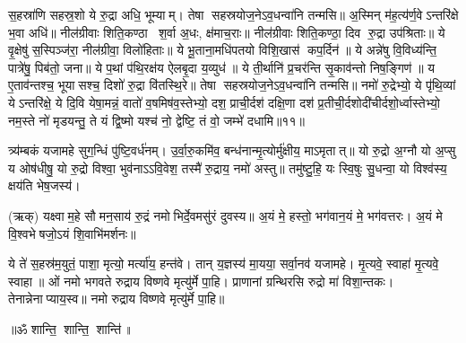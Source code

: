 स॒हस्रा॑णि सहस्र॒शो ये रु॒द्रा अधि॒ भूम्याम्। तेषा सहस्रयोज॒ने\-ऽव॒धन्वा॑नि तन्मसि॥ अ॒स्मिन् म॑ह॒त्य॑र्ण॒वेऽन्तरि॑क्षे भ॒वा अधि॑॥ नील॑ग्रीवाः शिति॒कण्ठा श॒र्वा अ॒धः, क्ष॑माच॒राः॥ नील॑ग्रीवाः शिति॒कण्ठा॒ दिव रु॒द्रा उप॑श्रिताः॥ ये वृ॒क्षेषु॑ स॒स्पिञ्ज॑रा॒ नील॑ग्रीवा॒ विलो॑हिताः॥ ये भू॒ताना॒मधि॑पतयो विशि॒खास॑ कप॒र्दिन॑॥ ये अन्ने॑षु वि॒विध्य॑न्ति॒ पात्रे॑षु॒ पिब॑तो॒ जना\sn ॥ ये प॒थां प॑थि॒रक्ष॑य ऐलबृ॒दा य॒व्युध॑॥ ये ती॒र्थानि॑ प्र॒चर॑न्ति सृ॒काव॑न्तो निष॒ङ्गिण॑॥ य ए॒ताव॑न्तश्च॒ भूयासश्च॒ दिशो॑ रु॒द्रा वि॑तस्थि॒रे॥ तेषा सहस्रयोज॒नेऽव॒धन्वा॑नि तन्मसि॥ नमो॑ रु॒द्रेभ्यो॒ ये पृ॑थि॒व्यां येऽन्तरि॑क्षे॒ ये दि॒वि येषा॒मन्नं॒ वातो॑ व॒\ar षमिष॑व॒स्तेभ्यो॒ दश॒ प्राची॒र्दश॑ दक्षि॒णा दश॑ प्र॒तीची॒र्दशो\-दी॑चीर्दशो॒र्ध्वास्तेभ्यो॒ नम॒स्ते नो॑ मृडयन्तु॒ ते यं द्वि॒ष्मो यश्च॑ नो॒ द्वेष्टि॒ तं वो॒ जम्भे॑ दधामि॥११॥ 

त्र्य॑म्बकं यजामहे सुग॒न्धिं पु॑ष्टि॒वर्ध॑नम्। उ॒र्वा॒रु॒कमि॑व॒ बन्ध॑नान्मृ॒त्योर्मु॑क्षीय॒ माऽमृतात्॥ यो रु॒द्रो अ॒ग्नौ यो अ॒प्सु य ओष॑धीषु॒ यो रु॒द्रो विश्वा॒ भुव॑नाऽऽवि॒वेश॒ तस्मै॑ रु॒द्राय॒ नमो॑ अस्तु॥ तमु॑ष्टु॒हि॒ यः स्वि॒षुः सु॒धन्वा॒ यो विश्व॑स्य॒ क्षय॑ति भेष॒जस्य॑। 

(ऋक्)   यक्ष्वाम॒हे सौमन॒साय॑ रु॒द्रं नमोभिर्दे॒वमसु॑रं दुवस्य॥ अ॒यं मे॒ हस्तो॒ भग॑वान॒यं मे॒ भग॑वत्तरः। अ॒यं मे वि॒श्वभेषजो॒ऽयं शि॒वाभि॑मर्शनः॥

ये ते॑ स॒हस्र॑म॒युतं॒ पाशा॒ मृत्यो॒ मर्त्या॑य॒ हन्त॑वे। तान् य॒ज्ञस्य॑ मा॒यया॒ सर्वा॒नव॑ यजामहे। मृ॒त्यवे॒ स्वाहा॑ मृ॒त्यवे॒ स्वाहा॥ ओं नमो भगवते रुद्राय विष्णवे मृत्यु॑र्मे पा॒हि। प्राणानां ग्रन्थिरसि रुद्रो मा॑ विशा॒न्तकः। तेनान्नेनाप्याय॒स्व॥ नमो रुद्राय विष्णवे मृत्यु॑र्मे पा॒हि॥
 
\centerline{॥ॐ शान्ति॒ शान्ति॒ शान्ति॑॥}


